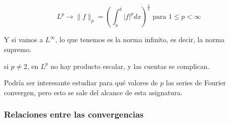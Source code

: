 		\begin{defn}[Convergencia\IS en $L^p$]

			\[L^p \rightarrow \|f\|_{p} = \left( \int^{b}_a |f|^p dx \right)^{\frac{1}{p}} \text{ para } 1 \leq p < \infty \]

		\end{defn}

			Y si vamos a $L^\infty$, lo que tenemos es la norma infinito, es decir, la norma supremo.

			\obs si $p\neq 2$, en $L^p$ no hay producto escalar, y las cuentas se complican.

			Podría ser interesante estudiar para qué valores de $p$ las series de Fourier convergen, pero esto se sale del alcance de esta asignatura.


	\subsubsection{Relaciones entre las convergencias}

